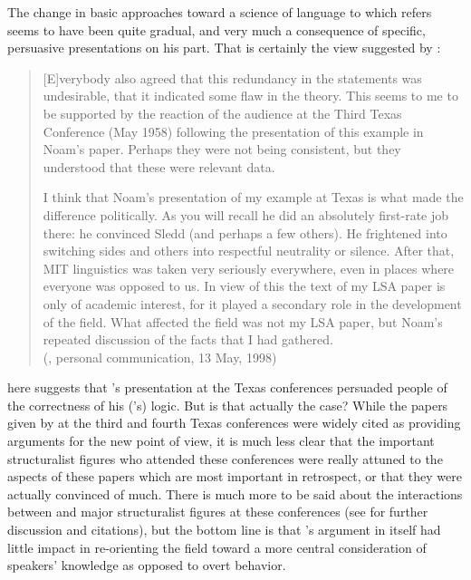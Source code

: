 The {change} in basic approaches toward a science of language to which
{\Chomsky} refers seems to have been quite gradual, and very much a
consequence of specific, persuasive presentations on his part. That is
certainly the view suggested by {\Halle}:

\begin{quotation}
  {[E]}verybody also agreed that this {redundancy} in the statements was
  undesirable, that it indicated some flaw in the theory. This seems
  to me to be supported by the reaction of the audience at the Third
  Texas Conference (May 1958) following the presentation of this
  example in Noam's paper.  Perhaps they were not being consistent,
  but they understood that these were relevant data.
  
  I think that Noam's presentation of my example at Texas is what made
  the difference politically.  As you will recall he did an absolutely
  first-rate job there: he convinced Sledd (and perhaps a few others).
  He frightened {\Stockwell} into switching sides and others into
  respectful neutrality or silence.  After that, MIT linguistics was
  taken very seriously everywhere, even in places where everyone was
  opposed to us.  In view of this the text of my LSA paper is only of
  academic interest, for it played a secondary role in the development
  of the field.  What affected the field was not my LSA paper, but
  Noam's repeated discussion of the facts that I had gathered.\\
  ({\Halle}, personal communication, 13 May, 1998)
\end{quotation}

{\Halle} here suggests that {\Chomsky}'s presentation at the Texas
conferences persuaded people of the correctness of his ({\Halle}'s)
logic. But is that actually the case? While the papers given by
{\Chomsky} at the third and fourth Texas conferences were widely cited as 
providing arguments for the new point of view, it is much less clear
that the important structuralist figures who attended these
conferences were really attuned to the aspects of these papers which 
are most important in retrospect, or that they were actually convinced 
of much. There is much more to be said about the interactions between
{\Chomsky} and major structuralist figures at these conferences (see
\citealt{sra00:royaumont} for further discussion and citations), but
the bottom line is that {\Halle}'s argument in itself had little impact
in re-orienting the field toward a more central consideration of
speakers' knowledge as opposed to overt behavior.

